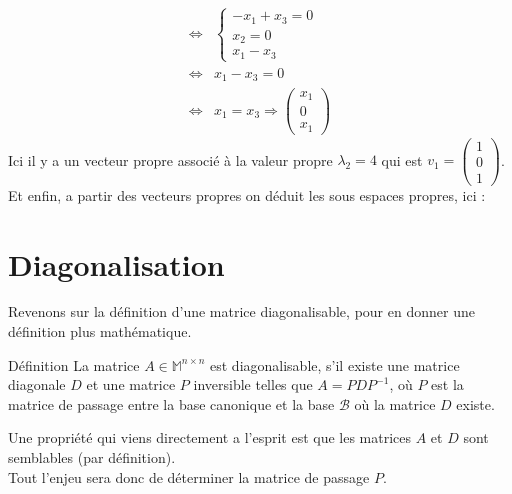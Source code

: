\begin{ex}
\begin{align*}
    \Leftrightarrow & \begin{cases}-x_1+x_3=0\\ x_2=0\\x_1-x_3\end{cases}\\
    \Leftrightarrow & x_1-x_3=0\\
    \Leftrightarrow & x_1=x_3 \Rightarrow \begin{pmatrix}x_1\\0\\x_1\end{pmatrix}
\end{align*}
Ici il y a un vecteur propre associé à la valeur propre $\lambda_2=4$ qui est $v_1=\begin{pmatrix}1\\0\\1\end{pmatrix}$.\\
\newline 
Et enfin, a partir des vecteurs propres on déduit les sous espaces propres, ici :
\end{ex}


\section{Diagonalisation}
Revenons sur la définition d'une matrice diagonalisable, pour en donner une définition plus mathématique.
\begin{bclogo}[couleur=blue!30,couleurBord=blue,arrondi=0.1,logo=\bcbook,ombre=true]{Définition}
La matrice $A\in\mathbb{M}^{n\times n}$ est diagonalisable, s'il existe une matrice diagonale $D$ et une matrice $P$ inversible telles que $A=PDP^{-1}$, où $P$ est la matrice de passage entre la base canonique et la base $\mathscr{B}$ où la matrice $D$ existe.
\end{bclogo}
Une propriété qui viens directement a l'esprit est que les matrices $A$ et $D$ sont semblables (par définition).\\
Tout l'enjeu sera donc de déterminer la matrice de passage $P$.

